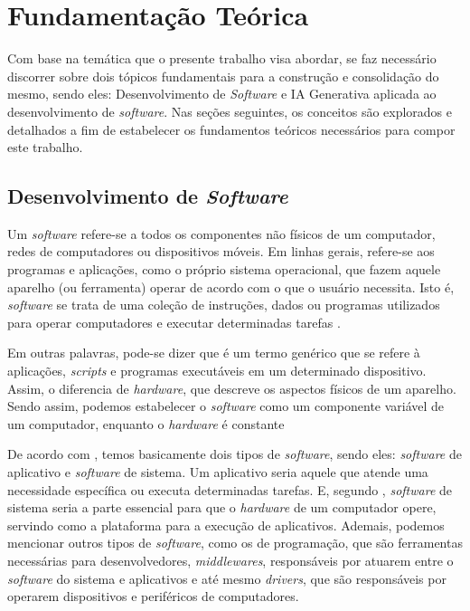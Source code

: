 \documentclass[english,brazilian]{UNISINOSartigo} %
\begin{document}
\section{Fundamentação Teórica}

Com base na temática que o presente trabalho visa abordar, se faz necessário discorrer sobre dois tópicos fundamentais para a construção e consolidação do mesmo, sendo eles: Desenvolvimento de \textit{Software} e IA Generativa aplicada ao desenvolvimento de \textit{software}. Nas seções seguintes, os conceitos são explorados e detalhados a fim de estabelecer os fundamentos teóricos necessários para compor este trabalho.

\subsection{Desenvolvimento de \textit{Software}}

Um \textit{software} refere-se a todos os componentes não físicos de um computador, redes de computadores ou dispositivos móveis. Em linhas gerais, refere-se aos programas e aplicações, como o próprio sistema operacional, que fazem aquele aparelho (ou ferramenta) operar de acordo com o que o usuário necessita. Isto é, \textit{software} se trata de uma coleção de instruções, dados ou programas utilizados para operar computadores e executar determinadas tarefas \cite{coutinho2021}.

Em outras palavras, pode-se dizer que é um termo genérico que se refere à aplicações, \textit{scripts} e programas executáveis em um determinado dispositivo. Assim, o diferencia de \textit{hardware}, que descreve os aspectos físicos de um aparelho. Sendo assim, podemos estabelecer o \textit{software} como um componente variável de um computador, enquanto o \textit{hardware} é constante \cite{sakurai2018}

De acordo com , temos basicamente dois tipos de \textit{software}, sendo eles: \textit{software} de aplicativo e \textit{software} de sistema. Um aplicativo seria aquele que atende uma necessidade específica ou executa determinadas tarefas. E, segundo , \textit{software} de sistema seria a parte essencial para que o \textit{hardware} de um computador opere, servindo como a plataforma para a execução de aplicativos. Ademais, podemos mencionar outros tipos de \textit{software}, como os de programação, que são ferramentas necessárias para desenvolvedores, \textit{middlewares}, responsáveis por atuarem entre o \textit{software} do sistema e aplicativos e até mesmo \textit{drivers}, que são responsáveis por operarem dispositivos e periféricos de computadores.
\end{document}
